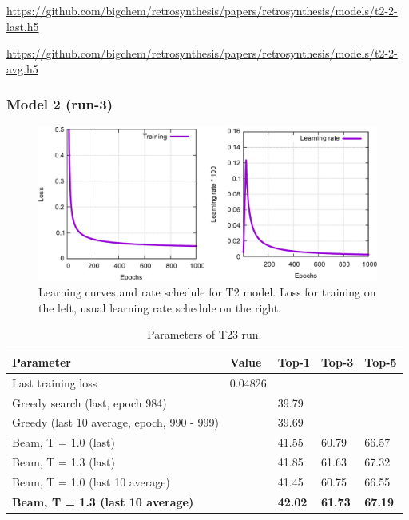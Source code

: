 \documentclass{article}
\begin{document}
\url{https://github.com/bigchem/retrosynthesis/papers/retrosynthesis/models/t2-2-last.h5}

\url{https://github.com/bigchem/retrosynthesis/papers/retrosynthesis/models/t2-2-avg.h5}

\newpage
 \subsubsection{Model 2 (run-3)}
 
\begin{figure}[h!]
  \centering
  \includegraphics[width = 16.5cm]{images/t2-3.pdf}
  \caption{Learning curves and rate schedule for T2 model. Loss for training on the left, usual learning rate schedule on the right.}
  \label{fig:t21}
\end{figure}

\begin{table}[h!]
\caption{Parameters of T23 run.}
  \centering
  \begin{tabular}{p{8.2cm}p{1.5cm}p{1.5cm}p{1.5cm}p{1.5cm}}
    \toprule
    Parameter & Value & Top-1 & Top-3 & Top-5 \\
    \midrule
    Last training loss & 0.04826 & & & \\
    \midrule
    Greedy search (last, epoch 984) & & 39.79 & & \\
    Greedy (last 10 average, epoch, 990 -  999) & & 39.69 & & \\
    \midrule
    Beam, T = 1.0 (last) & & 41.55 & 60.79 & 66.57  \\
    Beam, T = 1.3 (last) & & 41.85 & 61.63  & 67.32 \\ 
    \midrule
    Beam, T = 1.0 (last 10 average) & & 41.45  & 60.75 &  66.55\\
    \textbf{Beam, T = 1.3 (last 10 average)} & & \textbf{42.02}  & \textbf{61.73}  & \textbf{67.19} \\ 
    \bottomrule
  \end{tabular}
  \label{tbl:t23}

\end{table} 
\end{document}
